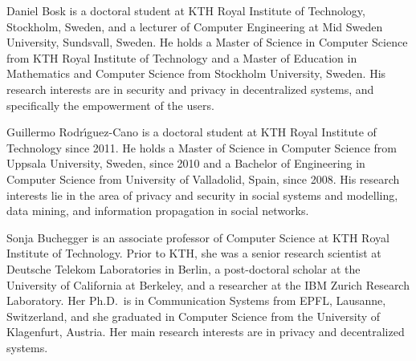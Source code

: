 \documentclass[a4paper]{llncs}
\begin{document}
Daniel Bosk is a doctoral student at KTH Royal Institute of Technology, 
Stockholm, Sweden, and a lecturer of Computer Engineering at Mid Sweden 
University, Sundsvall, Sweden.
He holds a Master of Science in Computer Science from KTH Royal Institute of 
Technology and a Master of Education in Mathematics and Computer Science from 
Stockholm University, Sweden.
His research interests are in security and privacy in decentralized systems, 
and specifically the empowerment of the users.

Guillermo Rodr\'{\i}guez-Cano is a doctoral student at KTH Royal Institute of 
Technology since 2011.
He holds a Master of Science in Computer Science from Uppsala University, 
Sweden, since 2010 and a Bachelor of Engineering in Computer Science from 
University of Valladolid, Spain, since 2008.
His research interests lie in the area of privacy and security in social 
systems and modelling, data mining, and information propagation in social 
networks.

Sonja Buchegger is an associate professor of Computer Science at KTH Royal 
Institute of Technology.
Prior to KTH, she was a
senior research scientist at Deutsche Telekom Laboratories in Berlin,
a post-doctoral scholar at the University of California at Berkeley,
and a researcher at the IBM Zurich Research Laboratory.
Her Ph.D.\ is in Communication Systems from EPFL, Lausanne, Switzerland, and 
she graduated in Computer Science from the University of Klagenfurt, Austria.
Her main research interests are in privacy and decentralized systems.
\end{document}
